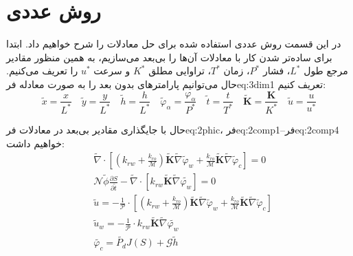 \chapter{روش عددی}
\label{ch:fasl3}
در این قسمت روش عددی استفاده شده برای حل معادلات را شرح خواهیم داد.
ابتدا برای ساده‌تر شدن کار با معادلات آن‌ها را بی‌بعد می‌سازیم، به همین منظور مقادیر مرجع طول $L^*$، فشار $P^*$، زمان $T^*$، تراوایی مطلق $K^*$ و سرعت $u^*$ را تعریف می‌کنیم. حال می‌توانیم پارامتر‌های بدون بعد را به صورت معادله ‌فر{eq:3dim1} تعریف کنیم:
\begin{equation}
\label{eq:3dim1}
\tilde{x}=\frac{x}{L^*} \quad
\tilde{y}=\frac{y}{L^*} \quad
\tilde{h}=\frac{h}{L^*} \quad
\tilde{\varphi}_\alpha=\frac{\varphi_\alpha}{P^*} \quad 
\tilde{t}=\frac{t}{T^*} \quad 
\tilde{\textbf{K}}=\frac{\textbf{K}}{K^*} \quad
\tilde{u}=\frac{u}{u^*}
\end{equation}

حال با جایگذاری مقادیر بی‌بعد در معادلات ‌فر{eq:2phic}، ‌فر{eq:2comp1}--‌فر{eq:2comp4} خواهیم داشت:
\begin{align}
\label{eq:3dim2}
&\tilde{\nabla}\cdot\left[
\left(k_{rw}+\frac{k_{ro}}{\mathcal{M}}\right)\tilde{\textbf{K}}\tilde{\nabla}\tilde{\varphi}_w +
\frac{k_{ro}}{\mathcal{M}}\tilde{\textbf{K}}\tilde{\nabla}\tilde{\varphi}_c \right] = 0\\
\label{eq:3dim3}
&\mathcal{N}\tilde{\phi}\frac{\partial S}{\partial \tilde{t} } - \tilde\nabla\cdot
\left[ k_{rw}\tilde{\textbf{K}}\tilde{\nabla}\tilde{\varphi_w} \right] = 0 \\
\label{eq:3dim4}
&\tilde{u} = -\frac{1}{\mathcal{P}} \cdot \left[
\left(k_{rw}+\frac{k_{ro}}{\mathcal{M}}\right)\tilde{\textbf{K}}\tilde{\nabla}\tilde{\varphi}_w +
\frac{k_{ro}}{\mathcal{M}}\tilde{\textbf{K}}\tilde{\nabla}\tilde{\varphi}_c \right] \\
\label{eq:3dim5}
&\tilde{u}_w =-\frac{1}{\mathcal{P}} \cdot 
k_{rw}\tilde{\textbf{K}}\tilde{\nabla}\tilde{\varphi_w} \\
\label{eq:3dim6}
&\tilde{\varphi_c} = \tilde{P_d}J(S) + \mathcal{G} \tilde{h} 
\end{align}

